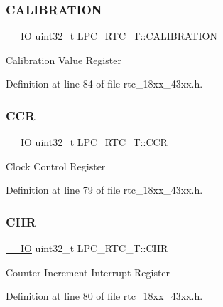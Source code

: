 \subsubsection{\texorpdfstring{C\+A\+L\+I\+B\+R\+A\+T\+I\+ON}{CALIBRATION}}
{\footnotesize\ttfamily \hyperlink{core__sc300_8h_aec43007d9998a0a0e01faede4133d6be}{\+\_\+\+\_\+\+IO} uint32\+\_\+t L\+P\+C\+\_\+\+R\+T\+C\+\_\+\+T\+::\+C\+A\+L\+I\+B\+R\+A\+T\+I\+ON}

Calibration Value Register 

Definition at line 84 of file rtc\+\_\+18xx\+\_\+43xx.\+h.

\mbox{\label{struct_l_p_c___r_t_c___t_ab2117371a628879dbc56f2c1774207b5}} 
\subsubsection{\texorpdfstring{C\+CR}{CCR}}
{\footnotesize\ttfamily \hyperlink{core__sc300_8h_aec43007d9998a0a0e01faede4133d6be}{\+\_\+\+\_\+\+IO} uint32\+\_\+t L\+P\+C\+\_\+\+R\+T\+C\+\_\+\+T\+::\+C\+CR}

Clock Control Register 

Definition at line 79 of file rtc\+\_\+18xx\+\_\+43xx.\+h.

\mbox{\label{struct_l_p_c___r_t_c___t_ac9d2627afcf203dccde2675c6c74d673}} 
\subsubsection{\texorpdfstring{C\+I\+IR}{CIIR}}
{\footnotesize\ttfamily \hyperlink{core__sc300_8h_aec43007d9998a0a0e01faede4133d6be}{\+\_\+\+\_\+\+IO} uint32\+\_\+t L\+P\+C\+\_\+\+R\+T\+C\+\_\+\+T\+::\+C\+I\+IR}

Counter Increment Interrupt Register 

Definition at line 80 of file rtc\+\_\+18xx\+\_\+43xx.\+h.

\mbox{\label{struct_l_p_c___r_t_c___t_a66b166ccd4abefe149e6e3ef6d833554}} 
